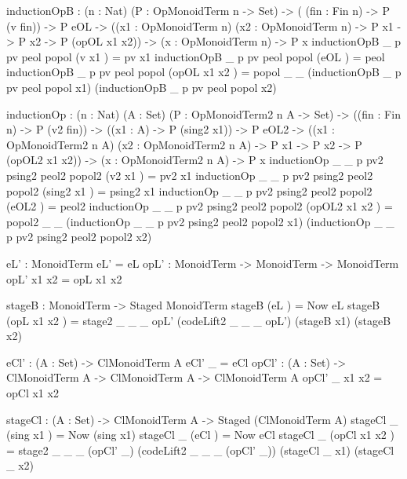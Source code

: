 \begin{togcode} 
  inductionOpB : (n : Nat) (P : OpMonoidTerm n -> Set) -> (
                   (fin : Fin n) -> P (v fin)) -> P eOL -> 
                   ((x1 : OpMonoidTerm n) (x2 : OpMonoidTerm n) -> 
                     P x1 -> P x2 -> P (opOL x1 x2)) -> 
                   (x : OpMonoidTerm n) -> P x
  inductionOpB _ p pv peol popol (v x1 ) = pv x1
  inductionOpB _ p pv peol popol (eOL ) = peol
  inductionOpB _ p pv peol popol (opOL x1 x2 ) = 
         popol _ _ (inductionOpB _ p pv peol popol x1) 
                   (inductionOpB _ p pv peol popol x2)

  inductionOp : (n : Nat) (A : Set) (P : OpMonoidTerm2 n A -> Set) -> 
                ((fin : Fin n) -> P (v2 fin)) -> 
                ((x1 : A) -> P (sing2 x1)) -> P eOL2 -> 
                ((x1 : OpMonoidTerm2 n A) (x2 : OpMonoidTerm2 n A) -> 
                P x1 -> P x2 -> P (opOL2 x1 x2)) -> 
                (x : OpMonoidTerm2 n A) -> P x
  inductionOp _ _ p pv2 psing2 peol2 popol2 (v2 x1 ) = pv2 x1
  inductionOp _ _ p pv2 psing2 peol2 popol2 (sing2 x1 ) = psing2 x1
  inductionOp _ _ p pv2 psing2 peol2 popol2 (eOL2 ) = peol2
  inductionOp _ _ p pv2 psing2 peol2 popol2 (opOL2 x1 x2 ) = 
         popol2 _ _ (inductionOp _ _ p pv2 psing2 peol2 popol2 x1) 
                    (inductionOp _ _ p pv2 psing2 peol2 popol2 x2)
\end{togcode} 
\begin{togcode}  
  eL' : MonoidTerm
  eL' = eL
  opL' : MonoidTerm -> MonoidTerm -> MonoidTerm
  opL' x1 x2 = opL x1 x2
  
  stageB : MonoidTerm -> Staged MonoidTerm
  stageB (eL ) = Now eL
  stageB (opL x1 x2 ) = 
       stage2 _ _ _ opL' (codeLift2 _ _ _ opL') (stageB x1) (stageB x2)
    
  eCl' : (A : Set) -> ClMonoidTerm A
  eCl' _ = eCl
  opCl' : (A : Set) -> ClMonoidTerm A -> ClMonoidTerm A -> ClMonoidTerm A
  opCl' _ x1 x2 = opCl x1 x2
   
  stageCl : (A : Set) -> ClMonoidTerm A -> Staged (ClMonoidTerm A)
  stageCl _ (sing x1 ) = Now (sing x1)
  stageCl _ (eCl ) = Now eCl
  stageCl _ (opCl x1 x2 ) = 
       stage2 _ _ _ (opCl' _) 
             (codeLift2 _ _ _ (opCl' _)) 
             (stageCl _ x1) (stageCl _ x2)
\end{togcode}
